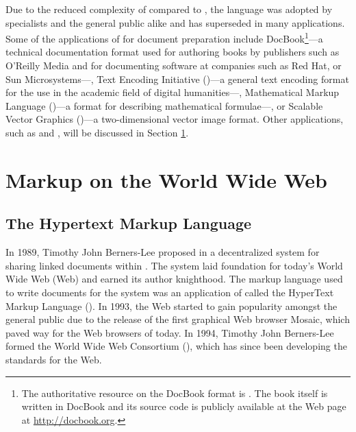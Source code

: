 \documentclass{book}
\begin{document}
        Due to the reduced complexity of  compared to
        , the language was adopted by specialists and the general
        public alike and has superseded  in many applications.
        Some of the applications of  for document
        preparation include DocBook\footnote{
          The authoritative resource on the DocBook  format is
          \cite{walsh10}. The book itself is written in DocBook and its source
          code is publicly available at the Web page at
          \url{http://docbook.org}.
        }---a technical documentation format used for authoring books by
        publishers such as O'Reilly Media and for documenting software at
        companies such as Red Hat,  or Sun Microsystems---,
        Text Encoding Initiative ()---a general text encoding
        format for the use in the academic field of digital humanities---,
        Mathematical Markup Language ()---a format for
        describing mathematical formulae---, or Scalable Vector Graphics
        ()---a two-dimensional vector image format. Other
         applications, such as  and
        , will be discussed in Section \ref{sec:www-markup}.
      
      \section{Markup on the World Wide Web}\label{sec:www-markup}
      \subsection{The Hypertext Markup Language}
        In 1989, Timothy John Berners-Lee proposed in \cite{bernerslee89} a
        decentralized system for sharing linked documents within .
        The system laid foundation for today's World Wide Web (Web) and earned
        its author knighthood. The markup language used to write documents for
        the system was an application of  called the HyperText
        Markup Language (). In 1993, the Web started to gain
        popularity amongst the general public due to the release of the first
        graphical Web browser Mosaic, which paved way for the Web browsers of
        today. In 1994, Timothy John Berners-Lee formed the World Wide Web
        Consortium (), which has since been developing the
        standards for the Web.
        
\end{document}
